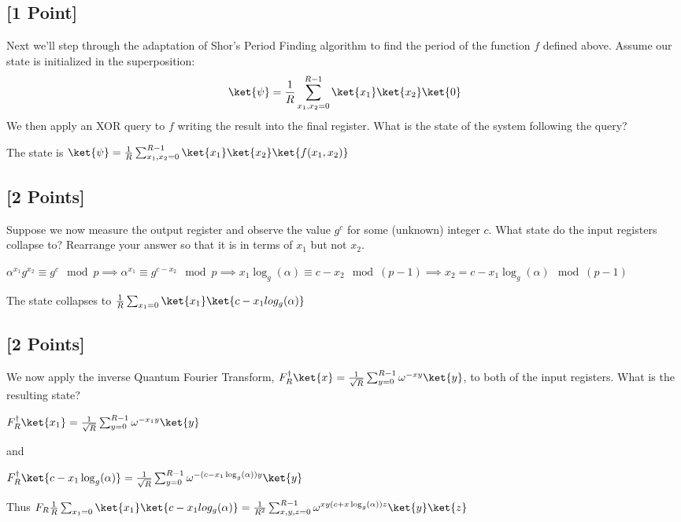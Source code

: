 \documentclass[11pt]{article}
\begin{document}
\subsection{[1 Point]} Next we'll step through the adaptation of Shor's Period Finding algorithm to find the period of the function $f$ defined above. Assume our state is initialized in the superposition:
\[
\ket{\psi} = \frac{1}{R}\sum_{x_1,x_2 =0}^{R-1}  \ket{x_1}\ket{x_2}\ket{0}
\]
We then apply an XOR query to $f$ writing the result into the final register. What is the state of the system following the query?

\begin{solution}
    The state is $\ket{\psi} =  \frac{1}{R}\sum_{x_1,x_2 =0}^{R-1}  \ket{x_1}\ket{x_2}\ket{f(x_1, x_2)}$ 

\end{solution}

\subsection{[2 Points]} Suppose we now measure the output register and observe the value $g^c$ for some (unknown) integer $c$. What state do the input registers collapse to? Rearrange your answer so that it is in terms of $x_1$ but not $x_2$.


\begin{solution}
    $\alpha^{x_1} g^{x_2} \equiv g^c \mod p \implies \alpha^{x_1} \equiv g^{c - x_2} \mod p \implies x_1 \log_g(\alpha) \equiv c - x_2 \mod (p - 1) \implies x_2 = c - x_1 \log_g(\alpha) \mod (p - 1)$
    
    The state collapses to $\frac{1}{R}\sum_{x_1 = 0}\ket{x_1} \ket{c - x_1 log_g(\alpha)}$ 
\end{solution}

\subsection{[2 Points]} We now apply the inverse Quantum Fourier Transform, $F_R^\dagger\ket{x}=\frac{1}{\sqrt{R}} \sum_{y=0}^{R-1} \omega^{-xy}\ket{y}$, to both of the input registers. What is the resulting state?

\begin{solution}
    $F_R^\dagger \ket{x_1} = \frac{1}{\sqrt{R}} \sum_{y=0}^{R-1} \omega^{-x_1 y}\ket{y}$ 

    and 
    
    $F_R^\dagger \ket{c - x_1 \log_g(\alpha)} = \frac{1}{\sqrt{R}} \sum_{y=0}^{R-1} \omega^{-(c - x_1 \log_g(\alpha)) y}\ket{y}$ 

    Thus $F_R \frac{1}{R}\sum_{x_1 = 0}\ket{x_1} \ket{c - x_1 log_g(\alpha)} = \frac{1}{R^2} \sum_{x, y, z = 0}^{R - 1} \omega^{x y (c + x\log_g(\alpha)) z}\ket{y}\ket{z}$ 
\end{solution}
\end{document}
